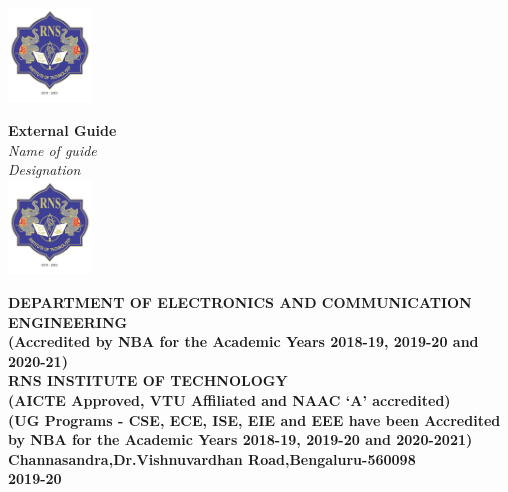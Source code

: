 \begin{titlingpage}
\begin{minipage}[t]{0.6\textwidth}
	\includegraphics[height=2.5cm]{images/rns1.jpg}
\end{minipage}\hspace{0.06cm}
\begin{minipage}[t]{0.3\textwidth}%
	\Large\textbf{External Guide}\\
	\large\textit{\color{blue}Name of guide}\\
	\large\textit{\color{blue}Designation}\\
	
	\centering\includegraphics[height=2.5cm]{images/rns1.jpg}\\
\end{minipage}



\begin{center}
\vspace{0.5cm}
\scriptsize\textbf{\color{blue}DEPARTMENT OF ELECTRONICS AND COMMUNICATION ENGINEERING\\
\small(Accredited by NBA for the Academic Years 2018-19, 2019-20 and 2020-21)}\\
\vspace{0.5cm}
\small\textbf{\color{blue}RNS INSTITUTE OF TECHNOLOGY\\
(AICTE Approved, VTU Affiliated and NAAC `A' accredited)\\
(UG Programs - CSE, ECE, ISE, EIE and EEE have been Accredited by NBA for the Academic Years 2018-19, 2019-20 and 2020-2021)\\
Channasandra,Dr.Vishnuvardhan Road,Bengaluru-560098\\
\vspace{0.5cm}
2019-20}
\end{center}
\end{titlingpage}
